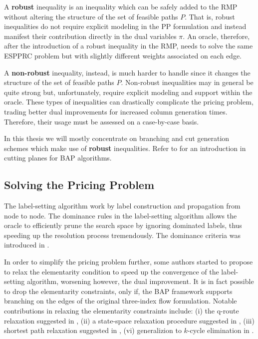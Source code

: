 A \textbf{robust} inequality is an inequality which can be safely added to the RMP without altering the structure of the set of feasible paths $P$.
That is, robust inequalities do not require explicit modeling in the PP formulation and instead manifest their contribution directly in the dual variables $\pi$.
An oracle, therefore, after the introduction of a robust inequality in the RMP, needs to solve the same ESPPRC problem but with slightly different weights associated on each edge.

A \textbf{non-robust} inequality, instead, is much harder to handle since it changes the structure of the set of feasible paths $P$.
Non-robust inequalities may in general be quite strong but, unfortunately, require explicit modeling and support within the oracle.
These types of inequalities can drastically complicate the pricing problem, trading better dual improvements for increased column generation times.
Therefore, their usage must be assessed on a case-by-case basis.


In this thesis we will mostly concentrate on branching and cut generation schemes which make use of \textbf{robust} inequalities.
Refer to \textcite{desaulniers2011} for an introduction in cutting planes for BAP algorithms.

\subsection{Solving the Pricing Problem}
\label{sec:intro-solving-the-pricing-problem}


The label-setting algorithm work by label construction and propagation from node to node.
The dominance rules in the label-setting algorithm allows the oracle
to efficiently prune the search space by ignoring dominated labels, thus speeding
up the resolution process tremendously.
The dominance criteria was introduced in \cite{feillet2004}.

In order to simplify the pricing problem further,
some authors started to propose to relax the elementarity condition
to speed up the convergence of the label-setting algorithm, worsening however, the dual improvement.
It is in fact possible to drop the elementarity constraints, only if, the BAP framework supports
branching on the edges of the original three-index flow formulation.
Notable contributions in relaxing the elementarity constraints include:
(i) the q-route relaxation suggested in \textcite{christofides1981},
(ii) a state-space relaxation procedure suggested in \textcite{christofides1981a},
(iii) shortest path relaxation suggested in \textcite{desrosiers1984},
(vi) generalizion to $k$-cycle elimination in \textcite{irnich2006}.

